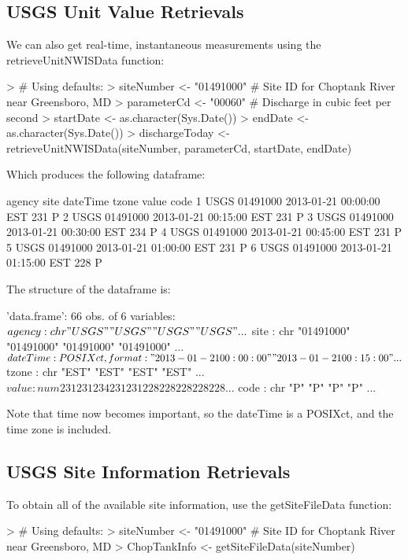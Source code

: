 \documentclass[a4paper,11pt]{article}
\begin{document}
\subsection{USGS Unit Value Retrievals}
We can also get real-time, instantaneous measurements using the retrieveUnitNWISData function:
\begin{Schunk}
\begin{Sinput}
> # Using defaults:
> siteNumber <- "01491000" # Site ID for Choptank River near Greensboro, MD
> parameterCd <- "00060"  # Discharge in cubic feet per second
> startDate <- as.character(Sys.Date())
> endDate <- as.character(Sys.Date())
> dischargeToday <- retrieveUnitNWISData(siteNumber, parameterCd, startDate, endDate)
\end{Sinput}
\end{Schunk}
Which produces the following dataframe:
\begin{Schunk}
\begin{Soutput}
  agency     site            dateTime tzone value code
1   USGS 01491000 2013-01-21 00:00:00   EST   231    P
2   USGS 01491000 2013-01-21 00:15:00   EST   231    P
3   USGS 01491000 2013-01-21 00:30:00   EST   234    P
4   USGS 01491000 2013-01-21 00:45:00   EST   231    P
5   USGS 01491000 2013-01-21 01:00:00   EST   231    P
6   USGS 01491000 2013-01-21 01:15:00   EST   228    P
\end{Soutput}
\end{Schunk}
The structure of the dataframe is:
\begin{Schunk}
\begin{Soutput}
'data.frame':	66 obs. of  6 variables:
 $ agency  : chr  "USGS" "USGS" "USGS" "USGS" ...
 $ site    : chr  "01491000" "01491000" "01491000" "01491000" ...
 $ dateTime: POSIXct, format: "2013-01-21 00:00:00" "2013-01-21 00:15:00" ...
 $ tzone   : chr  "EST" "EST" "EST" "EST" ...
 $ value   : num  231 231 234 231 231 228 228 228 228 228 ...
 $ code    : chr  "P" "P" "P" "P" ...
\end{Soutput}
\end{Schunk}
Note that time now becomes important, so the dateTime is a POSIXct, and the time zone is included. 

\subsection{USGS Site Information Retrievals}
To obtain all of the available site information, use the getSiteFileData function:
\begin{Schunk}
\begin{Sinput}
> # Using defaults:
> siteNumber <- "01491000" # Site ID for Choptank River near Greensboro, MD
> ChopTankInfo <- getSiteFileData(siteNumber)
\end{Sinput}
\end{Schunk}
\end{document}
